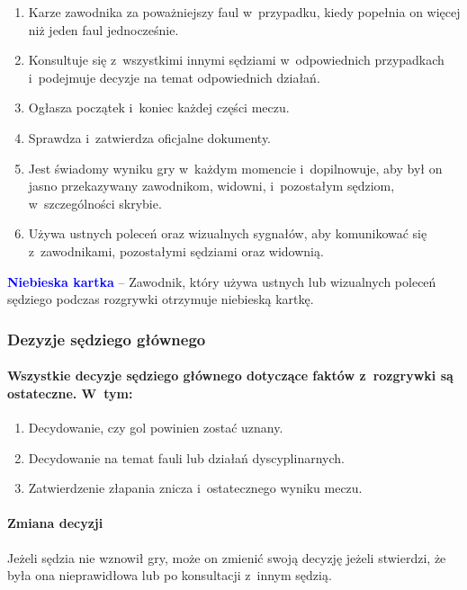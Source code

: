 \documentclass[12pt,a4paper]{article}
\newcommand\bluecard[1]{\bgroup\textcolor{blue}{\textbf{#1}}}
\begin{document}
\begin{enumerate}
	\item Karze zawodnika za poważniejszy faul w~przypadku, kiedy popełnia on
	      więcej niż jeden faul jednocześnie.

	\item Konsultuje się z~wszystkimi innymi sędziami w~odpowiednich
	      przypadkach i~podejmuje decyzje na temat odpowiednich działań.

	\item Ogłasza początek i~koniec każdej części meczu.

	\item Sprawdza i~zatwierdza oficjalne dokumenty.

	\item Jest świadomy wyniku gry w~każdym momencie i~dopilnowuje, aby był on
	      jasno przekazywany zawodnikom, widowni, i~pozostałym sędziom, w~szczególności skrybie.

	\item Używa ustnych poleceń oraz wizualnych sygnałów, aby komunikować się z~zawodnikami, pozostałymi sędziami oraz widownią.
\end{enumerate}

\bluecard{Niebieska kartka} -- Zawodnik, który używa ustnych lub wizualnych
poleceń sędziego podczas rozgrywki otrzymuje niebieską kartkę.

\subsubsection{Dezyzje sędziego głównego}

\paragraph{Wszystkie decyzje sędziego głównego dotyczące faktów z~rozgrywki są ostateczne. W~tym:}
\begin{enumerate}
	\item Decydowanie, czy gol powinien zostać uznany.

	\item Decydowanie na temat fauli lub działań dyscyplinarnych.

	\item Zatwierdzenie złapania znicza i~ostatecznego wyniku meczu.
\end{enumerate}

\paragraph{Zmiana decyzji}
Jeżeli sędzia nie wznowił gry, może
on zmienić swoją decyzję jeżeli stwierdzi, że była ona nieprawidłowa lub
po konsultacji z~innym sędzią.
\end{document}

